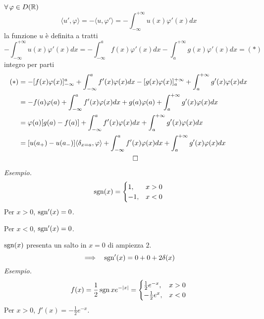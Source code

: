 $\forall \varphi \in D(\RR)$
\begin{equation*}
\langle u',\varphi \rangle = - \langle u,\varphi '\rangle = - \int ^{ + \infty }_{ - \infty } u(x) \varphi '(x) dx
\end{equation*}
la funzione $u$ è definita a tratti
\begin{equation*}
- \int ^{ + \infty }_{ - \infty } u(x) \varphi '(x) dx = -\int ^{a}_{ - \infty } f(x) \varphi '(x) dx - \int ^{ + \infty }_{a} g(x) \varphi '(x) dx = (*)
\end{equation*}
integro per parti
\begin{gather*}
\begin{aligned}
(*) & = - [ f(x) \varphi (x)]^{a}_{ - \infty } + \int ^{a}_{ - \infty } f'(x) \varphi (x) dx - [ g(x) \varphi (x)]^{ + \infty }_{a} + \int ^{ + \infty }_{a} g'(x) \varphi (x) dx\\
 & = - f(a) \varphi (a) + \int ^{a}_{ - \infty } f'(x) \varphi (x) dx + g(a) \varphi (a) + \int ^{ + \infty }_{a} g'(x) \varphi (x) dx\\
 & = \varphi (a)[ g(a) - f(a)] + \int ^{a}_{ - \infty } f'(x) \varphi (x) dx + \int ^{ + \infty }_{a} g'(x) \varphi (x) dx\\
 & = [ u(a_{ + }) - u(a_{ - })] \langle \delta _{x = a} ,\varphi \rangle + \int ^{a}_{ - \infty } f'(x) \varphi (x) dx + \int ^{ + \infty }_{a} g'(x) \varphi (x) dx
\end{aligned}\\
\qed 
\end{gather*}
\textit{Esempio.}
\begin{equation*}
\operatorname{sgn}(x) = 
\begin{cases}
1, & x > 0\\
- 1, & x < 0
\end{cases}
\end{equation*}
Per $x > 0$, $\operatorname{sgn} '(x) = 0$.

Per $x < 0$, $\operatorname{sgn} '(x) = 0$.

$\operatorname{sgn}(x)$ presenta un salto in $x = 0$ di ampiezza $2$.
\begin{equation*}
\implies \ \ \operatorname{sgn} '(x) = 0 + 0 + 2\delta (x)
\end{equation*}
\textit{Esempio.}
\begin{equation*}
f(x) = \frac{1}{2}\operatorname{sgn} xe^{ - | x| } = 
\begin{cases}
\frac{1}{2} e^{ - x} , & x > 0\\
- \frac{1}{2} e^{x} , & x < 0
\end{cases}
\end{equation*}
Per $x > 0$, $f'(x) = - \frac{1}{2} e^{ - x}$.

